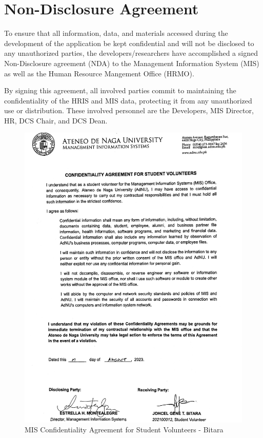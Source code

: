 \chapter{Non-Disclosure Agreement}

\label{nda}

To ensure that all information, data, and materials accessed during the development of the application be kept confidential and will not be disclosed to any unauthorized parties, the developers/researchers have accomplished a signed Non-Disclosure agreement (NDA) to the Management Information System (MIS) as well as the Human Resource Mangement Office (HRMO). 

By signing this agreement, all involved parties commit to maintaining the confidentiality of the HRIS and MIS data, protecting it from any unauthorized use or distribution. These involved personnel are the Developers, MIS Director, HR, DCS Chair, and DCS Dean.

\begin{figure}[H]
    \centering
    \includegraphics[width=1\textwidth]{figures/images/nda/mis-nda-bitara.JPG}
    \caption{MIS Confidentiality Agreement for Student Volunteers - Bitara}
    \label{fig:mis-nda-bitara}
\end{figure}

